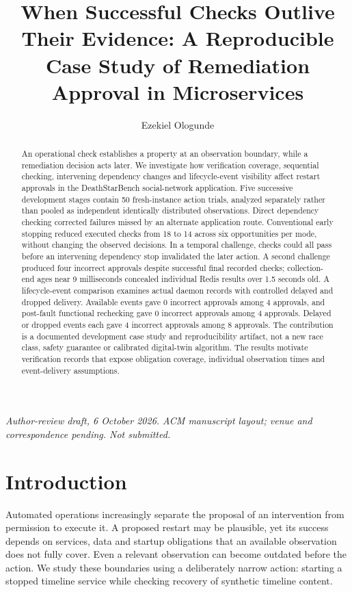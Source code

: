 \documentclass[manuscript,review,nonacm]{acmart}
\title{When Successful Checks Outlive Their Evidence: A Reproducible Case Study of Remediation Approval in Microservices}
\author{Ezekiel Ologunde}
\affiliation{\institution{Independent Researcher}}
\begin{document}
\begin{abstract}
An operational check establishes a property at an observation boundary, while a remediation decision acts later. We investigate how verification coverage, sequential checking, intervening dependency changes and lifecycle-event visibility affect restart approvals in the DeathStarBench social-network application. Five successive development stages contain 50 fresh-instance action trials, analyzed separately rather than pooled as independent identically distributed observations. Direct dependency checking corrected failures missed by an alternate application route. Conventional early stopping reduced executed checks from 18 to 14 across six opportunities per mode, without changing the observed decisions. In a temporal challenge, checks could all pass before an intervening dependency stop invalidated the later action. A second challenge produced four incorrect approvals despite successful final recorded checks; collection-end ages near 9 milliseconds concealed individual Redis results over 1.5 seconds old. A lifecycle-event comparison examines actual daemon records with controlled delayed and dropped delivery. Available events gave 0 incorrect approvals among 4 approvals, and post-fault functional rechecking gave 0 incorrect approvals among 4 approvals. Delayed or dropped events each gave 4 incorrect approvals among 8 approvals. The contribution is a documented development case study and reproducibility artifact, not a new race class, safety guarantee or calibrated digital-twin algorithm. The results motivate verification records that expose obligation coverage, individual observation times and event-delivery assumptions.
\end{abstract}
\maketitle
\noindent\textit{Author-review draft, 6 October 2026. ACM manuscript layout; venue and correspondence pending. Not submitted.}

\section{Introduction}
Automated operations increasingly separate the proposal of an intervention from permission to execute it. A proposed restart may be plausible, yet its success depends on services, data and startup obligations that an available observation does not fully cover. Even a relevant observation can become outdated before the action. We study these boundaries using a deliberately narrow action: starting a stopped timeline service while checking recovery of synthetic timeline content.
\end{document}
